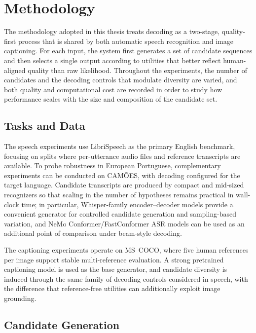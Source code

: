 \chapter{Methodology}
\label{chapter:methodology}


The methodology adopted in this thesis treats decoding as a two-stage, quality-first process that is shared by both automatic speech recognition and image captioning. For each input, the system first generates a set of candidate sequences and then selects a single output according to utilities that better reflect human-aligned quality than raw likelihood. Throughout the experiments, the number of candidates and the decoding controls that modulate diversity are varied, and both quality and computational cost are recorded in order to study how performance scales with the size and composition of the candidate set.

\section{Tasks and Data}

The speech experiments use LibriSpeech as the primary English benchmark, focusing on splits where per-utterance audio files and reference transcripts are available. To probe robustness in European Portuguese, complementary experiments can be conducted on CAM\~{O}ES, with decoding configured for the target language. Candidate transcripts are produced by compact and mid-sized recognizers so that scaling in the number of hypotheses remains practical in wall-clock time; in particular, Whisper-family encoder--decoder models provide a convenient generator for controlled candidate generation and sampling-based variation, and NeMo Conformer/FastConformer ASR models can be used as an additional point of comparison under beam-style decoding.

The captioning experiments operate on MS~COCO, where five human references per image support stable multi-reference evaluation. A strong pretrained captioning model is used as the base generator, and candidate diversity is induced through the same family of decoding controls considered in speech, with the difference that reference-free utilities can additionally exploit image grounding.

\section{Candidate Generation}

